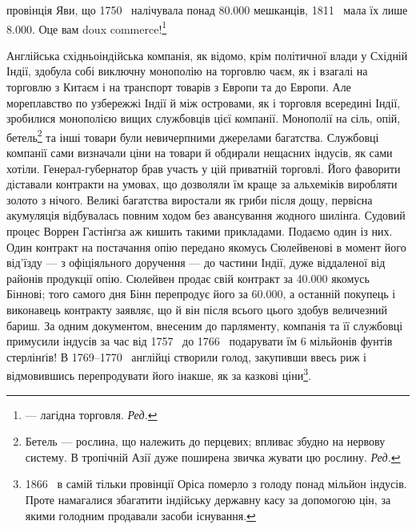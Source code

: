 \parcont{}  %
провінція Яви, що 1750~ налічувала понад \num{80.000} мешканців,
1811~ мала їх лише \num{8.000}. Оце вам doux commerce!\footnote*{
— лагідна торговля. \emph{Ред.}
}

Англійська східньоіндійська компанія, як відомо, крім політичної
влади у Східній Індії, здобула собі виключну монополію
на торговлю чаєм, як і взагалі на торговлю з Китаєм і на транспорт
товарів з Европи та до Европи. Але мореплавство по узбережжі
Індії й між островами, як і торговля всередині Індії,
зробилися монополією вищих службовців цієї компанії. Монополії
на сіль, опій, бетель\footnote*{
Бетель — рослина, що належить до перцевих; впливає збудно на
нервову систему. В тропічній Азії дуже поширена звичка жувати цю рослину.
\emph{Ред.}
} та інші товари були невичерпними
джерелами багатства. Службовці компанії сами визначали ціни
на товари й обдирали нещасних індусів, як сами хотіли. Генерал-губернатор
брав участь у цій приватній торговлі. Його фаворити
діставали контракти на умовах, що дозволяли їм краще за альхеміків
виробляти золото з нічого. Великі багатства виростали
як гриби після дощу, первісна акумуляція відбувалась повним
ходом без авансування жодного шилінґа. Судовий процес Воррен
Гастінґза аж кишить такими прикладами. Подаємо один із
них. Один контракт на постачання опію передано якомусь Сюлейвенові
в момент його від’їзду — з офіціяльного доручення —
до частини Індії, дуже віддаленої від районів продукції опію.
Сюлейвен продає свій контракт за \num{40.000} якомусь
Біннові; того самого дня Бінн перепродує його за \num{60.000}, а останній покупець і виконавець контракту заявляє,
що й він після всього цього здобув величезний бариш.
За одним документом, внесеним до парляменту, компанія та її
службовці примусили індусів за час від 1757~ до 1766~ подарувати
їм 6 мільйонів фунтів стерлінґів! В 1769--1770~
англійці створили голод, закупивши ввесь риж і відмовившись
перепродувати його інакше, як за казкові ціни\footnote{
1866~ в самій тільки провінції Оріса померло з голоду понад
мільйон індусів. Проте намагалися збагатити індійську державну касу
за допомогою цін, за якими голодним продавали засоби існування.
}.

